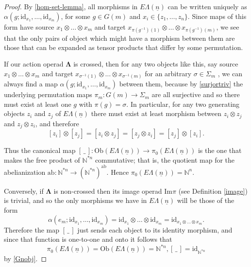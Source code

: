 \documentclass{amsbook} %
\newcommand{\id}{\textrm{id}}
\newcommand{\ML}{\mathbf{\Lambda}}
\newcommand{\ELn}{E\Lambda(\underline{n})}
\newcommand{\ab}{\mathrm{ab}}
\numberwithin{section}{chapter}
\begin{document}
\begin{proof}
By \cref{hom-set-lemma}, all morphisms in $\ELn$ can be written uniquely as $\alpha(g; \id_{x_1}, \ldots, \id_{x_m})$, for some $g \in G(m)$ and $x_i \in \{z_1, \ldots, z_n \}$. Since maps of this form have source $x_1 \otimes \ldots \otimes x_m$ and target $x_{\pi(g^{-1})(1)} \otimes \ldots \otimes x_{\pi(g^{-1})(m)}$, we see that the only pairs of object which might have a morphism between them are those that can be expanded as tensor products that differ by some permutation. 


If our action operad $\ML$ is crossed, then for any two objects like this, say source $x_1 \otimes \ldots \otimes x_m$ and target $x_{\sigma^{-1}(1)} \otimes \ldots \otimes x_{\sigma^{-1}(m)}$ for an arbitrary $\sigma \in \Sigma_m$ , we can always find a map $\alpha(g; \id_{x_1}, \ldots, \id_{x_m})$ between them, because by \cref{surjortriv} the underlying permutation maps $\pi_m \colon  G(m) \rightarrow \Sigma_m$ are all surjective and so there must exist at least one $g$ with $\pi(g) = \sigma$. In particular, for any two generating objects $z_i$ and $z_j$ of $\ELn$ there must exist at least morphism between $z_i \otimes z_j$ and $z_j \otimes z_i$, and therefore
  \[
    [z_i] \otimes [z_j] = [z_i \otimes z_j] = [z_j \otimes z_i] = [z_j] \otimes [z_i].
  \]

Thus the canonical map $[ \, \_ \, ] \colon \mathrm{Ob}(\ELn) \rightarrow \pi_0(\ELn)$ is the one that makes the free product of $\mathbb{N}^{*n}$ commutative; that is, the quotient map for the abelianization $\ab \colon \mathbb{N}^{*n} \rightarrow (\mathbb{N}^{*n})^{\ab}$. Hence $\pi_0(\ELn) = \mathbb{N}^n$.

Conversely, if $\ML$ is non-crossed then its image operad $\mathrm{Im}\pi$ (see Definition \ref{image}) is trivial, and so the only morphisms we have in $\ELn$ will be those of the form
  \[
    \alpha(e_m;\id_{x_1}, \ldots, \id_{x_m}) = \id_{x_1} \otimes \ldots \otimes \id_{x_m} = \id_{x_1 \otimes \ldots \otimes x_m}.
  \]
Therefore the map $[ \, \_ \,]$ just sends each object to its identity morphism, and since that function is one-to-one and onto it follows that
  \[
    \pi_0(\ELn) = \mathrm{Ob}(\ELn) = \mathbb{N}^{\ast n}, [ \, \_ \,] = \id_{\mathbb{N}^{*n}}
  \]
by \cref{Gnobj}.
\end{proof}
\end{document}
